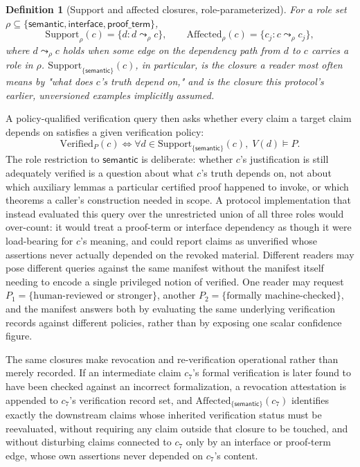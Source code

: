 \documentclass[11pt]{article}
\newtheorem{definition}{Definition}
\begin{document}
\begin{definition}[Support and affected closures, role-parameterized]
For a role set $\rho \subseteq \{\mathsf{semantic}, \mathsf{interface}, \mathsf{proof\_term}\}$,
\[
\mathrm{Support}_\rho(c) = \{ d : d \leadsto_\rho c \},
\qquad
\mathrm{Affected}_\rho(c) = \{ c_j : c \leadsto_\rho c_j \},
\]
where $d \leadsto_\rho c$ holds when some edge on the dependency path from $d$ to $c$ carries a role in $\rho$. $\mathrm{Support}_{\{\mathsf{semantic}\}}(c)$, in particular, is the closure a reader most often means by "what does $c$'s truth depend on," and is the closure this protocol's earlier, unversioned examples implicitly assumed.
\end{definition}

A policy-qualified verification query then asks whether every claim a target claim depends on satisfies a given verification policy:
\[
\mathrm{Verified}_P(c) \iff \forall d \in \mathrm{Support}_{\{\mathsf{semantic}\}}(c),\; V(d) \models P.
\]
The role restriction to $\mathsf{semantic}$ is deliberate: whether $c$'s justification is still adequately verified is a question about what $c$'s truth depends on, not about which auxiliary lemmas a particular certified proof happened to invoke, or which theorems a caller's construction needed in scope. A protocol implementation that instead evaluated this query over the unrestricted union of all three roles would over-count: it would treat a proof-term or interface dependency as though it were load-bearing for $c$'s meaning, and could report claims as unverified whose assertions never actually depended on the revoked material.
Different readers may pose different queries against the same manifest without the manifest itself needing to encode a single privileged notion of verified. One reader may request $P_1 = \{\text{human-reviewed or stronger}\}$, another $P_2 = \{\text{formally machine-checked}\}$, and the manifest answers both by evaluating the same underlying verification records against different policies, rather than by exposing one scalar confidence figure.

The same closures make revocation and re-verification operational rather than merely recorded. If an intermediate claim $c_7$'s formal verification is later found to have been checked against an incorrect formalization, a revocation attestation is appended to $c_7$'s verification record set, and $\mathrm{Affected}_{\{\mathsf{semantic}\}}(c_7)$ identifies exactly the downstream claims whose inherited verification status must be reevaluated, without requiring any claim outside that closure to be touched, and without disturbing claims connected to $c_7$ only by an interface or proof-term edge, whose own assertions never depended on $c_7$'s content.
\end{document}
